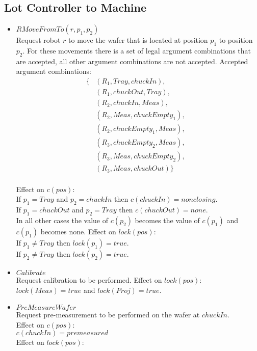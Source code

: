 \subsection{Lot Controller to Machine}
\begin{itemize}
\item $RMoveFromTo(r, p_1, p_2)$
\\Request robot $r$ to move the wafer that is located at position $p_1$ to position $p_2$. For these movements there is a set of legal argument combinations that are accepted, all other argument combinations are not accepted. Accepted argument combinations: 
\begin{align*}
\{ & (R_1, Tray, chuckIn),&\\
& (R_1, chuckOut, Tray),&\\
&(R_2, chuckIn, Meas),&\\
&(R_2, Meas, chuckEmpty_1),&\\
&(R_2, chuckEmpty_1, Meas),&\\
&(R_3, chuckEmpty_2, Meas),&\\
&(R_3, Meas, chuckEmpty_2),&\\
&(R_3, Meas, chuckOut)\}
\end{align*}\\
Effect on $c(pos)$:\\
If $p_1 = Tray$ and $p_2 = chuckIn$ then $c(chuckIn) = nonclosing$.\\
If $p_1 = chuckOut$ and $p_2 = Tray$ then $c(chuckOut) = none$.\\
In all other cases the value of $c(p_2)$ becomes the value of $c(p_1)$ and $c(p_1)$ becomes none.
Effect on $lock(pos)$:\\
If $p_1 \neq Tray$ then $lock(p_1) = true$.\\
If $p_2 \neq Tray$ then $lock(p_2) = true$.\\
\item $Calibrate$
\\Request calibration to be performed.
Effect on $lock(pos)$:\\
$lock(Meas) = true$ and $lock(Proj) = true$.\\
\item $PreMeasureWafer$
\\Request pre-measurement to be performed on the wafer at $chuckIn$.\\
Effect on $c(pos)$:\\
$c(chuckIn) = premeasured$\\
Effect on $lock(pos)$:\\

\end{itemize}
